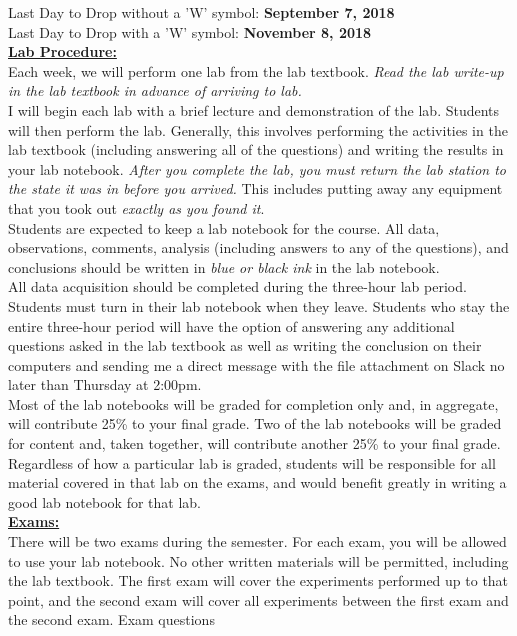 \documentclass[12pt]{amsart}
\begin{document}
Last Day to Drop without a 'W' symbol: \textbf{September 7, 2018}\\
Last Day to Drop with a 'W' symbol: \textbf{November 8, 2018}\\
\textbf{\underline{Lab Procedure:}}\\ 
Each week, we will perform one lab from the lab textbook. \textit{Read the lab write-up in
the lab textbook in advance of arriving to lab.} \\ I will begin each lab with a brief lecture and demonstration of the lab. Students will then perform the lab. Generally, this involves performing the activities in the lab textbook (including answering all of the questions) and writing the results in your lab notebook. \textit{After you complete the lab, you must return the lab station to the state it was in before you arrived.}
This includes putting away any equipment that you took out \textit{exactly as you found it}.\\
Students are expected to keep a lab notebook for the course. All data, observations,
comments, analysis (including answers to any of the questions), and conclusions should be
written in \textit{blue or black ink} in the lab notebook.\\
All data acquisition should be completed during the three-hour lab period. Students must turn in their lab notebook when they leave. Students who stay the entire three-hour period will have the option of answering any additional questions asked in the lab textbook as well as writing the conclusion on their computers and sending me a direct message with the file attachment on Slack no later than Thursday at 2:00pm.\\
Most of the lab notebooks will be graded for completion only and, in aggregate, will
contribute 25\% to your final grade. Two of the lab notebooks will be graded for content
and, taken together, will contribute another 25\% to your final grade. Regardless of how a
particular lab is graded, students will be responsible for all material covered in that lab on the exams, and would benefit greatly in writing a good lab notebook for that lab.\\
\textbf{\underline{Exams:}}\\ 
There will be two exams during the semester. For each exam, you will be allowed to use
your lab notebook. No other written materials will be permitted, including the lab textbook.
The first exam will cover the experiments performed up to that point, and the second exam
will cover all experiments between the first exam and the second exam. Exam questions
\end{document}

